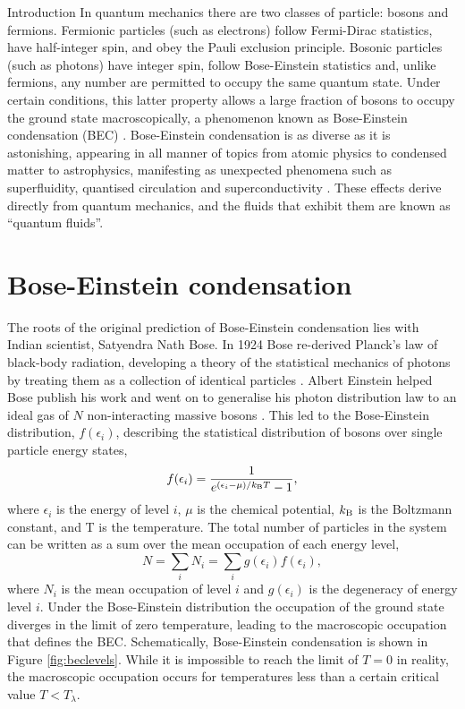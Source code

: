 \begin{chapter}{\label{cha:bose_gases}Introduction}
In quantum mechanics there are two classes of particle: bosons and fermions. Fermionic particles (such as electrons) follow Fermi-Dirac statistics, have half-integer spin, and obey the Pauli exclusion principle. Bosonic particles (such as photons) have integer spin, follow Bose-Einstein statistics and, unlike fermions, any number are permitted to occupy the same quantum state. Under certain conditions, this latter property allows a large fraction of bosons to occupy the ground state macroscopically, a phenomenon known as Bose-Einstein condensation (BEC) \cite{Pethick,stringari}. Bose-Einstein condensation is as diverse as it is astonishing, appearing in all manner of topics from atomic physics to condensed matter to astrophysics, manifesting as unexpected phenomena such as superfluidity, quantised circulation and superconductivity \cite{griffin1996bose,tilley1990superfluidity}. These effects derive directly from quantum mechanics, and the fluids that exhibit them are known as ``quantum fluids''.

\section{Bose-Einstein condensation}\label{section:becinintro}
The roots of the original prediction of Bose-Einstein condensation lies with Indian scientist, Satyendra Nath Bose. In 1924 Bose re-derived Planck's law of black-body radiation, developing a theory of the statistical mechanics of photons by treating them as a collection of identical particles \cite{bose}. Albert Einstein helped Bose publish his work and went on to generalise his photon distribution law to an ideal gas of $N$ non-interacting massive bosons \cite{Einstein24}. This led to the Bose-Einstein distribution, $f(\epsilon_i)$, describing the statistical distribution of bosons over single particle energy states,
\begin{equation}
	f(\epsilon_i) = \frac{1}{e^{(\epsilon_i - \mu) / k_{\rm B}T} - 1},
\end{equation}
where $\epsilon_i$ is the energy of level $i$, $\mu$ is the chemical potential, $k_{\rm B}$ is the Boltzmann constant, and T is the temperature. The total number of particles in the system can be written as a sum over the mean occupation of each energy level,
\begin{equation}
	N = \sum\limits_i N_i = \sum\limits_i g(\epsilon_i)f(\epsilon_i),
\end{equation}
where $N_i$ is the mean occupation of level $i$ and $g(\epsilon_i)$ is the degeneracy of energy level $i$. Under the Bose-Einstein distribution the occupation of the ground state diverges in the limit of zero temperature, leading to the macroscopic occupation that defines the BEC. Schematically, Bose-Einstein condensation is shown in Figure \ref{fig:beclevels}. While it is impossible to reach the limit of $T=0$ in reality, the macroscopic occupation occurs for temperatures less than a certain critical value $T<T_\lambda$.


\end{chapter}
